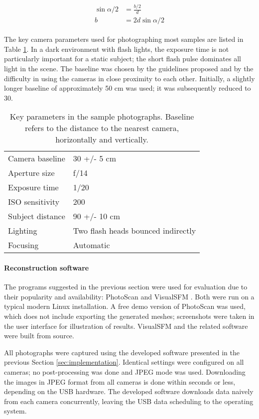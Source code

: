 \begin{align} \begin{split} \label{eq:baselinedegrees}
	\sin \alpha/2 &= \frac{b/2}{d}\\
	b &= 2 d \sin \alpha/2
\end{split} \end{align}

The key camera parameters used for photographing most samples are listed in Table \ref{tab:sampleshotparams}.
In a dark environment with flash lights, the exposure time is not particularly important for a static subject; the short flash pulse dominates all light in the scene.
The baseline was chosen by the guidelines proposed and by the difficulty in using the cameras in close proximity to each other.
Initially, a slightly longer baseline of approximately 50 cm was used; it was subsequently reduced to 30.

\begin{table}[h]
	\centering
	\begin{tabular}{l l}
		Camera baseline & 30 +/- 5 cm\\
		Aperture size & f/14\\
		Exposure time & 1/20\\
		ISO sensitivity & 200\\
		Subject distance & 90 +/- 10 cm\\
		Lighting & Two flash heads bounced indirectly\\
		Focusing & Automatic\\
	\end{tabular}
	\caption{
		Key parameters in the sample photographs.
		Baseline refers to the distance to the nearest camera, horizontally and vertically.
	}
	\label{tab:sampleshotparams}
\end{table}

\paragraph{Reconstruction software}
The programs suggested in the previous section were used for evaluation due to their popularity and availability: PhotoScan \cite{photoscan} and VisualSFM \cite{wu2013towards}.
Both were run on a typical modern Linux installation.
A free demo version of PhotoScan was used, which does not include exporting the generated meshes; screenshots were taken in the user interface for illustration of results.
VisualSFM and the related software were built from source.

All photographs were captured using the developed software presented in the previous Section \ref{sec:implementation}.
Identical settings were configured on all cameras; no post-processing was done and JPEG mode was used.
Downloading the images in JPEG format from all cameras is done within seconds or less, depending on the USB hardware.
The developed software downloads data naively from each camera concurrently, leaving the USB data scheduling to the operating system.
